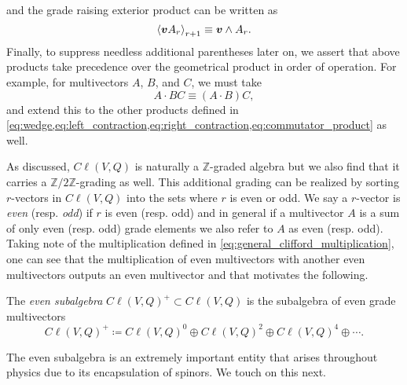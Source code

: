 and the grade raising exterior product can be written as
\begin{equation}
    \proj{r+1}{\blade{v}A_r} \equiv \blade{v} \wedge A_r.
\end{equation}
Finally, to suppress needless additional parentheses later on, we assert that above products take precedence over the geometrical product in order of operation. For example, for multivectors $A$, $B$, and $C$, we must take
\begin{equation}
A\cdot B C \equiv (A \cdot B)C,
\end{equation}
and extend this to the other products defined in \cref{eq:wedge,eq:left_contraction,eq:right_contraction,eq:commutator_product} as well. 

As discussed, $C\ell(V,Q)$ is naturally a $\mathbb{Z}$-graded algebra but we also find that it carries a $\mathbb{Z}/2\mathbb{Z}$-grading as well. This additional grading can be realized by sorting $r$-vectors in $C\ell(V,Q)$ into the sets where $r$ is even or odd.  We say a $r$-vector is \emph{even} (resp. \emph{odd}) if $r$ is even (resp. odd) and in general if a multivector $A$ is a sum of only even (resp. odd) grade elements we also refer to $A$ as even (resp. odd).  Taking note of the multiplication defined in \ref{eq:general_clifford_multiplication}, one can see that the multiplication of even multivectors with another even multivectors outputs an even multivector and that motivates the following.
\begin{definition}
The \emph{even subalgebra} $C\ell(V,Q)^+ \subset C\ell(V,Q)$ is the subalgebra of even grade multivectors
\begin{equation}
    C\ell(V,Q)^+ \coloneqq C\ell(V,Q)^0 \oplus C\ell(V,Q)^2 \oplus C\ell(V,Q)^4 \oplus \cdots.
\end{equation}
\end{definition}
The even subalgebra is an extremely important entity that arises throughout physics due to its encapsulation of spinors. We touch on this next.

